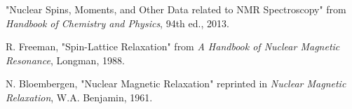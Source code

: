 \begin{thebibliography}{3}

	"Nuclear Spins, Moments, and Other Data related to NMR Spectroscopy" from \emph{Handbook of Chemistry and Physics},
	94th ed.,
	2013.

	R. Freeman,
	"Spin-Lattice Relaxation" from \emph{A Handbook of Nuclear Magnetic Resonance},
	Longman,
	1988.

	N. Bloembergen,
	"Nuclear Magnetic Relaxation" reprinted in \emph{Nuclear Magnetic Relaxation},
	W.A. Benjamin,
	1961.

\end{thebibliography}


